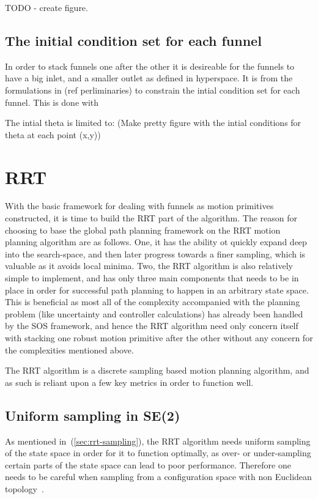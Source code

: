 TODO - create figure.


\subsection{The initial condition set for each funnel}

In order to stack funnels one after the other it is desireable for the funnels
to have a big inlet, and a smaller outlet as defined in hyperspace. It is from
the formulations in (ref perliminaries) to constrain the intial condition set
for each funnel. This is done with

The intial theta is limited to: (Make pretty figure with the intial conditions
for theta at each point (x,y))

\section{RRT}

With the basic framework for dealing with funnels as motion primitives
constructed, it is time to build the \ac{RRT} part of the \rrtfunnel{}
algorithm. The reason for choosing to base the global path planning framework on
the \ac{RRT} motion planning algorithm are as follows. One, it has the ability
ot quickly expand deep into the search-space, and then later progress towards a
finer sampling, which is valuable as it avoids local minima. Two, the \ac{RRT}
algorithm is also relatively simple to implement, and has only three main
components that needs to be in place in order for successful path planning to
happen in an arbitrary state space. This is beneficial as most all of the
complexity accompanied with the planning problem (like uncertainty and
controller calculations) has already been handled by the \ac{SOS} framework, and
hence the \ac{RRT} algorithm need only concern itself with stacking one robust
motion primitive after the other without any concern for the complexities
mentioned above.

The \ac{RRT} algorithm is a discrete sampling based motion planning algorithm,
and as such is reliant upon a few key metrics in order to function well.

\subsection{Uniform sampling in SE(2)}

As mentioned in~(\ref{sec:rrt-sampling}), the \ac{RRT} algorithm needs
uniform sampling of the state space in order for it to function optimally, as
over- or under-sampling certain parts of the state space can lead to poor
performance. Therefore one needs to be careful when sampling from a
configuration space with non Euclidean
topology~\cite{kuffnerEffectiveSamplingDistance2004}.

